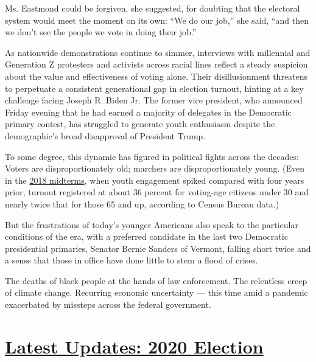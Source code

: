 Ms. Eastmond could be forgiven, she suggested, for doubting that the
electoral system would meet the moment on its own: ``We do our job,''
she said, ``and then we don't see the people we vote in doing their
job.''

As nationwide demonstrations continue to simmer, interviews with
millennial and Generation Z protesters and activists across racial lines
reflect a steady suspicion about the value and effectiveness of voting
alone. Their disillusionment threatens to perpetuate a consistent
generational gap in election turnout, hinting at a key challenge facing
Joseph R. Biden Jr. The former vice president, who announced Friday
evening that he had earned a majority of delegates in the Democratic
primary contest, has struggled to generate youth enthusiasm despite the
demographic's broad disapproval of President Trump.

To some degree, this dynamic has figured in political fights across the
decades: Voters are disproportionately old; marchers are
disproportionately young. (Even in the
\href{https://www.census.gov/library/stories/2019/04/behind-2018-united-states-midterm-election-turnout.html}{2018
midterms}, when youth engagement spiked compared with four years prior,
turnout registered at about 36 percent for voting-age citizens under 30
and nearly twice that for those 65 and up, according to Census Bureau
data.)

But the frustrations of today's younger Americans also speak to the
particular conditions of the era, with a preferred candidate in the last
two Democratic presidential primaries, Senator Bernie Sanders of
Vermont, falling short twice and a sense that those in office have done
little to stem a flood of crises.

The deaths of black people at the hands of law enforcement. The
relentless creep of climate change. Recurring economic uncertainty ---
this time amid a pandemic exacerbated by missteps across the federal
government.

\hypertarget{latest-updates-2020-election}{%
\section{\texorpdfstring{\href{https://www.nytimes.com/2020/07/31/us/elections/biden-vs-trump.html?action=click\&pgtype=Article\&state=default\&region=MAIN_CONTENT_1\&context=storylines_live_updates}{Latest
Updates: 2020
Election}}{Latest Updates: 2020 Election}}\label{latest-updates-2020-election}}

